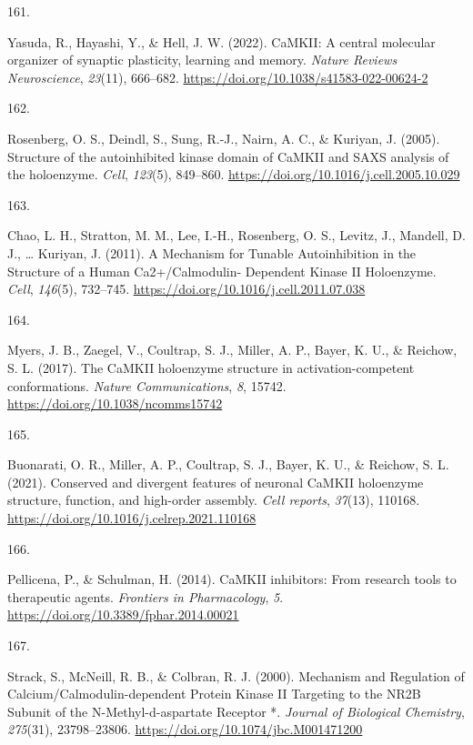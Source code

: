 \documentclass[
  11pt,
  letterpaper,
]{scrreprt}
\newlength{\cslhangindent}
\newlength{\csllabelwidth}
\newenvironment{CSLReferences}[2] %
 {\begin{list}{}{%
  \setlength{\itemindent}{0pt}
  \setlength{\leftmargin}{0pt}
  \setlength{\parsep}{0pt}
  \ifodd #1
   \setlength{\leftmargin}{\cslhangindent}
   \setlength{\itemindent}{-1\cslhangindent}
  \fi
  \setlength{\itemsep}{#2\baselineskip}}}
 {\end{list}}
\newcommand{\CSLLeftMargin}[1]{\parbox[t]{\csllabelwidth}{\strut#1\strut}}
\newcommand{\CSLRightInline}[1]{\parbox[t]{\linewidth - \csllabelwidth}{\strut#1\strut}}
\begin{document}
\begin{CSLReferences}{0}{0}
\CSLLeftMargin{161. }%
\CSLRightInline{Yasuda, R., Hayashi, Y., \& Hell, J. W. (2022).
{CaMKII}: A central molecular organizer of synaptic plasticity, learning
and memory. \emph{Nature Reviews Neuroscience}, \emph{23}(11), 666--682.
\url{https://doi.org/10.1038/s41583-022-00624-2}}

\CSLLeftMargin{162. }%
\CSLRightInline{Rosenberg, O. S., Deindl, S., Sung, R.-J., Nairn, A. C.,
\& Kuriyan, J. (2005). Structure of the autoinhibited kinase domain of
{CaMKII} and {SAXS} analysis of the holoenzyme. \emph{Cell},
\emph{123}(5), 849--860.
\url{https://doi.org/10.1016/j.cell.2005.10.029}}

\CSLLeftMargin{163. }%
\CSLRightInline{Chao, L. H., Stratton, M. M., Lee, I.-H., Rosenberg, O.
S., Levitz, J., Mandell, D. J., \ldots{} Kuriyan, J. (2011). A
{Mechanism} for {Tunable Autoinhibition} in the {Structure} of a {Human
Ca2}+/{Calmodulin- Dependent Kinase II Holoenzyme}. \emph{Cell},
\emph{146}(5), 732--745.
\url{https://doi.org/10.1016/j.cell.2011.07.038}}

\CSLLeftMargin{164. }%
\CSLRightInline{Myers, J. B., Zaegel, V., Coultrap, S. J., Miller, A.
P., Bayer, K. U., \& Reichow, S. L. (2017). The {CaMKII} holoenzyme
structure in activation-competent conformations. \emph{Nature
Communications}, \emph{8}, 15742.
\url{https://doi.org/10.1038/ncomms15742}}

\CSLLeftMargin{165. }%
\CSLRightInline{Buonarati, O. R., Miller, A. P., Coultrap, S. J., Bayer,
K. U., \& Reichow, S. L. (2021). Conserved and divergent features of
neuronal {CaMKII} holoenzyme structure, function, and high-order
assembly. \emph{Cell reports}, \emph{37}(13), 110168.
\url{https://doi.org/10.1016/j.celrep.2021.110168}}

\CSLLeftMargin{166. }%
\CSLRightInline{Pellicena, P., \& Schulman, H. (2014). {CaMKII}
inhibitors: From research tools to therapeutic agents. \emph{Frontiers
in Pharmacology}, \emph{5}.
\url{https://doi.org/10.3389/fphar.2014.00021}}

\CSLLeftMargin{167. }%
\CSLRightInline{Strack, S., McNeill, R. B., \& Colbran, R. J. (2000).
Mechanism and {Regulation} of {Calcium}/{Calmodulin-dependent Protein
Kinase II Targeting} to the {NR2B Subunit} of the {N-Methyl-d-aspartate
Receptor} *. \emph{Journal of Biological Chemistry}, \emph{275}(31),
23798--23806. \url{https://doi.org/10.1074/jbc.M001471200}}


\end{CSLReferences}
\end{document}
